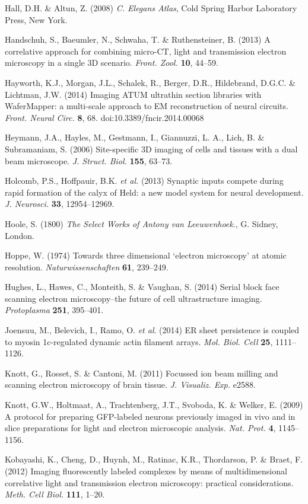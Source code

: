 \documentclass{article}
\begin{document}
\begin{hangpars}
Hall, D.H. \& Altun, Z. (2008) \textit{C. Elegans Atlas}, Cold Spring Harbor Laboratory Press, New York.

Handschuh, S., Baeumler, N., Schwaha, T. \& Ruthensteiner, B. (2013) A correlative approach for combining micro-CT, light and transmission electron microscopy in a single 3D scenario. \textit{Front. Zool.} \textbf{10}, 44–59.

Hayworth, K.J., Morgan, J.L., Schalek, R., Berger, D.R., Hildebrand, D.G.C. \& Lichtman, J.W. (2014) Imaging ATUM ultrathin section libraries with WaferMapper: a multi-scale approach to EM reconstruction of neural circuits. \textit{Front. Neural Circ.} \textbf{8}, 68. doi:10.3389/fncir.2014.00068

Heymann, J.A., Hayles, M., Gestmann, I., Giannuzzi, L. A., Lich, B. \& Subramaniam, S. (2006) Site-specific 3D imaging of cells and tissues with a dual beam microscope. \textit{J. Struct. Biol.} \textbf{155}, 63–73.

Holcomb, P.S., Hoffpauir, B.K. \textit{et al.} (2013) Synaptic inputs compete during rapid formation of the calyx of Held: a new model system for neural development. \textit{J. Neurosci.} \textbf{33}, 12954–12969.

Hoole, S. (1800) \textit{The Select Works of Antony van Leeuwenhoek}., G. Sidney, London.

Hoppe, W. (1974) Towards three dimensional ‘electron microscopy’ at atomic resolution. \textit{Naturwissenschaften} \textbf{61}, 239–249.

Hughes, L., Hawes, C., Monteith, S. \& Vaughan, S. (2014) Serial block face scanning electron microscopy–the future of cell ultrastructure imaging. \textit{Protoplasma} \textbf{251}, 395–401.

Joensuu, M., Belevich, I., Ramo, O. \textit{et al}. (2014) ER sheet persistence is coupled to myosin 1c-regulated dynamic actin filament arrays. \textit{Mol. Biol. Cell} \textbf{25}, 1111–1126.

Knott, G., Rosset, S. \& Cantoni, M. (2011) Focussed ion beam milling and scanning electron microscopy of brain tissue. \textit{J. Visualiz. Exp.} e2588.

Knott, G.W., Holtmaat, A., Trachtenberg, J.T., Svoboda, K. \& Welker, E. (2009) A protocol for preparing GFP-labeled neurons previously imaged in vivo and in slice preparations for light and electron microscopic analysis. \textit{Nat. Prot.} \textbf{4}, 1145–1156.

Kobayashi, K., Cheng, D., Huynh, M., Ratinac, K.R., Thordarson, P. \& Braet, F. (2012) Imaging fluorescently labeled complexes by means of multidimensional correlative light and transmission electron microscopy: practical considerations. \textit{Meth. Cell Biol.} \textbf{111}, 1–20.


\end{hangpars}
\end{document}
